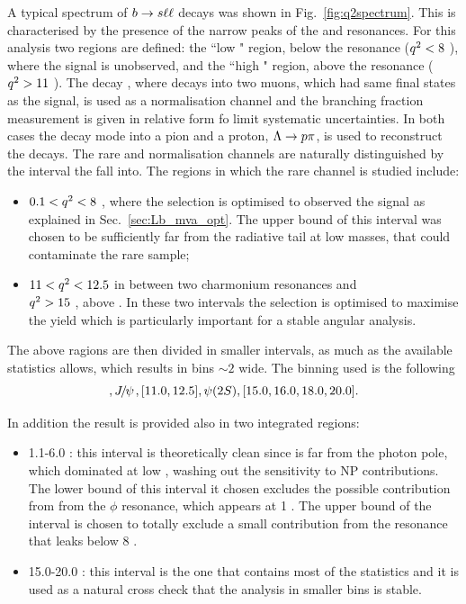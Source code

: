 A typical \qsq spectrum of ${b}\rightarrow{\ensuremath{s}}\ell\ell$ decays was shown in Fig.~\ref{fig:q2spectrum}.
This is characterised by the presence of the narrow peaks of the \jpsi and \psitwos resonances.
For this analysis two regions are defined: the ``low \qsq" region, below the \jpsi resonance (${q^2} < 8$ \gevgevcccc),
where the signal is unobserved, and the ``high \qsq" region, above the \jpsi resonance (${q^2} > 11$ \gevgevcccc).
The decay \Lb\to\jpsi\Lz, where \jpsi decays into two muons, which had same final states as the signal,
is used as a normalisation channel and the branching fraction measurement is given in relative form
fo limit systematic uncertainties. In both cases the \Lz decay mode into a pion and a proton, $\Lz\to p\pi$,
is used to reconstruct the decays. The rare and normalisation channels are naturally distinguished
by the \qsq interval the fall into. The regions in which the rare channel is studied include:
\begin{itemize}
\item $0.1 < {q^2} < 8$ \gevgevcccc, where the selection is optimised to observed the signal as explained in Sec.~\ref{sec:Lb_mva_opt}.
The upper bound of this interval was chosen to be sufficiently far from the \jpsi radiative tail at low masses, that
could contaminate the rare sample;
\item  $11 < {q^2} < 12.5$ \gevgevcccc in between two charmonium resonances and \\${q^2}>15$ \gevgevcccc, above \psitwos.
In these two intervals the selection is optimised to maximise the yield which is particularly important
for a stable angular analysis.
\end{itemize}
The above ragions are then divided in smaller intervals, as much as the available statistics allows, which results
in bins $\sim 2$ \gevgevcccc wide. The binning used is the following 
\begin{equation}
[0.1, 2.0, 4.0, 6.0, 8.0], \jpsi, [11.0, 12.5], \psitwos, [15.0, 16.0, 18.0, 20.0].
\end{equation}

In addition the result is provided also in two integrated regions:
\begin{itemize}
\item 1.1-6.0 \gevgevcccc: this interval is theoretically clean since is far from the
photon pole, which dominated at low \qsq, washing out the sensitivity to NP contributions.
The lower bound of this interval it chosen excludes the possible contribution from
from the $\phi$ resonance, which appears at 1 \gevgevcccc. The upper bound of the interval
is chosen to totally exclude a small contribution from the \jpsi resonance that leaks
below 8 \gevgevcccc.
\item 15.0-20.0 \gevgevcccc: this interval is the one that contains most of the
statistics and it is used as a natural cross check that the analysis in smaller bins is stable.
\end{itemize}

